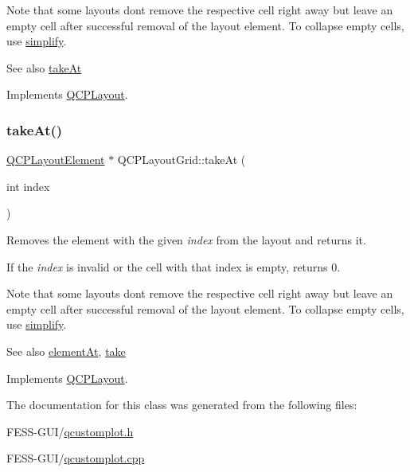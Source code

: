 Note that some layouts don\textquotesingle{}t remove the respective cell right away but leave an empty cell after successful removal of the layout element. To collapse empty cells, use \hyperlink{class_q_c_p_layout_grid_a08bba60e4acd20165526a8fd7f986b58}{simplify}.

\begin{DoxySeeAlso}{See also}
\hyperlink{class_q_c_p_layout_grid_acc1277394ff8a6432e111ff9463e6375}{take\+At} 
\end{DoxySeeAlso}


Implements \hyperlink{class_q_c_p_layout_ada26cd17e56472b0b4d7fbbc96873e4c}{Q\+C\+P\+Layout}.

\hypertarget{class_q_c_p_layout_grid_acc1277394ff8a6432e111ff9463e6375}{}\label{class_q_c_p_layout_grid_acc1277394ff8a6432e111ff9463e6375} 
\subsubsection{\texorpdfstring{take\+At()}{takeAt()}}
{\footnotesize\ttfamily \hyperlink{class_q_c_p_layout_element}{Q\+C\+P\+Layout\+Element} $\ast$ Q\+C\+P\+Layout\+Grid\+::take\+At (\begin{DoxyParamCaption}\item[{int}]{index }\end{DoxyParamCaption})\hspace{0.3cm}{\ttfamily [virtual]}}

Removes the element with the given {\itshape index} from the layout and returns it.

If the {\itshape index} is invalid or the cell with that index is empty, returns 0.

Note that some layouts don\textquotesingle{}t remove the respective cell right away but leave an empty cell after successful removal of the layout element. To collapse empty cells, use \hyperlink{class_q_c_p_layout_grid_a08bba60e4acd20165526a8fd7f986b58}{simplify}.

\begin{DoxySeeAlso}{See also}
\hyperlink{class_q_c_p_layout_grid_a97672ecc379cb3a09639926ba9980297}{element\+At}, \hyperlink{class_q_c_p_layout_grid_a666a9fe9e92054436f9b66eba25cca0c}{take} 
\end{DoxySeeAlso}


Implements \hyperlink{class_q_c_p_layout_a5a79621fa0a6eabb8b520cfc04fb601a}{Q\+C\+P\+Layout}.



The documentation for this class was generated from the following files\+:\begin{DoxyCompactItemize}
\item 
F\+E\+S\+S-\/\+G\+U\+I/\hyperlink{qcustomplot_8h}{qcustomplot.\+h}\item 
F\+E\+S\+S-\/\+G\+U\+I/\hyperlink{qcustomplot_8cpp}{qcustomplot.\+cpp}\end{DoxyCompactItemize}
